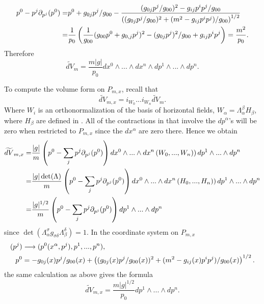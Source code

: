 \begin{subappendices}
\begin{align}
p^0-p^j\partial_{p^j}(p^0)=& p^0+g_{0j}p^j/g_{00}-\frac{(g_{0j}p^j/g_{00})^2-g_{ij}p^ip^j/g_{00}}{\left((g_{0j}p^j/g_{00})^2+(m^2-g_{ij}p^ip^j)/g_{00}\right)^{1/2}}\notag\\
=&\frac{1}{p_0}\left(\frac{1}{g_{00}}(g_{00}p^0+g_{0,j}p^j)^2-(g_{0j}p^j)^2/g_{00}+g_{ij}p^ip^j\right)=\frac{m^2}{p_0}.
\end{align}
Therefore
\begin{equation}
\widetilde{dV}_m=\frac{m|g|}{p_0}dx^0\wedge...\wedge dx^n\wedge dp^1\wedge...\wedge dp^n.
\end{equation}

To compute the volume form on $P_{m,x}$, recall  that 
\begin{equation}\label{contract_horiz}
\widetilde{dV}_{m,x}=i_{W_0}...i_{W_n}\widetilde{dV}_m.
\end{equation}
Where $W_i$ is an orthonormalization of the basis of horizontal fields, $W_\alpha=\Lambda^\beta_\alpha H_\beta$, where $H_\beta$ are defined in . All of the contractions in  that involve the $dp^\alpha$'s will be zero when restricted to $P_{m,x}$ since the $dx^\alpha$ are zero there. Hence we obtain
\begin{align}\label{dV_x}
\widetilde{dV}_{m,x}=&\frac{|g|}{m}\left(p^0-\sum_{j}p^j \partial_{p^j}(p^0) \right)dx^0\wedge...\wedge dx^n\left(W_0,...,W_n)\right) dp^1\wedge...\wedge dp^n\notag\\
=&\frac{|g|\det(\Lambda)}{m}\left(p^0-\sum_{j}p^j \partial_{p^j}(p^0) \right)dx^0\wedge...\wedge dx^n\left(H_0,...,H_n)\right) dp^1\wedge...\wedge dp^n\notag\\
=&\frac{|g|^{1/2}}{m}\left(p^0-\sum_{j}p^j \partial_{p^j}(p^0) \right) dp^1\wedge...\wedge dp^n
\end{align}
since $\det(\Lambda^\sigma_\alpha g_{\sigma\delta}\Lambda^\delta_\beta)=1$.
 In the coordinate system on $P_{m,x}$
\begin{align}
(p^j)&\longrightarrow (p^0(x^\alpha,p^j),p^1,...,p^n),\notag\\
 p^0&=-g_{0j}(x)p^j/g_{00}(x)+\left((g_{0j}(x)p^j/g_{00}(x))^2+(m^2-g_{ij}(x)p^ip^j)/g_{00}(x)\right)^{1/2}.
\end{align}
 the same calculation as above gives the formula
\begin{equation}
\widetilde{dV}_{m,x}=\frac{m|g|^{1/2}}{p_0}dp^1\wedge...\wedge dp^n.
\end{equation}
\end{subappendices}



